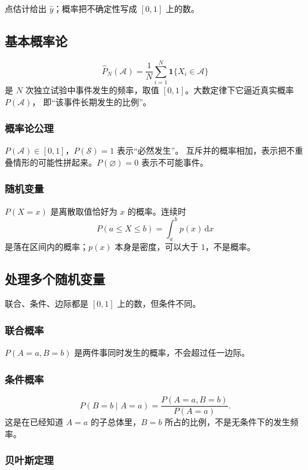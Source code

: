 点估计给出 $\hat{y}$；概率把不确定性写成 $[0,1]$ 上的数。

\subsection{基本概率论}

\[
\widehat{P}_N(\mathcal{A})
=
\frac{1}{N}\sum_{i=1}^{N}\mathbf{1}\{X_i\in\mathcal{A}\}
\]
是 $N$ 次独立试验中事件发生的频率，取值 $[0,1]$。大数定律下它逼近真实概率 $P(\mathcal{A})$，
即“该事件长期发生的比例”。

\subsubsection{概率论公理}

$P(\mathcal{A})\in[0,1]$，$P(\mathcal{S})=1$ 表示“必然发生”。
互斥并的概率相加，表示把不重叠情形的可能性拼起来。$P(\varnothing)=0$ 表示不可能事件。

\subsubsection{随机变量}

$P(X=x)$ 是离散取值恰好为 $x$ 的概率。连续时
\[
P(a\le X\le b)=\int_{a}^{b}p(x)\,\mathrm{d}x
\]
是落在区间内的概率；$p(x)$ 本身是密度，可以大于 $1$，不是概率。

\subsection{处理多个随机变量}

联合、条件、边际都是 $[0,1]$ 上的数，但条件不同。

\subsubsection{联合概率}

$P(A=a,B=b)$ 是两件事同时发生的概率，不会超过任一边际。

\subsubsection{条件概率}

\[
P(B=b\mid A=a)
=
\frac{P(A=a,B=b)}{P(A=a)}.
\]
这是在已经知道 $A=a$ 的子总体里，$B=b$ 所占的比例，不是无条件下的发生频率。

\subsubsection{贝叶斯定理}

